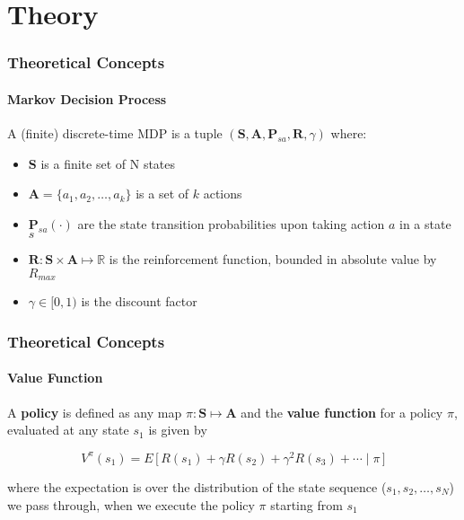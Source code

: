 \section{Theory}

\begin{frame}
	\frametitle{Theoretical Concepts}
	\framesubtitle{Markov Decision Process}
	
	\large
	
	\vspace{0.1cm}
	
	A (finite) discrete-time MDP is a tuple $ (\mathbf{S},\mathbf{A},\mathbf{P}_{sa},
	\mathbf{R},\gamma) $ where:
	\vspace{0.1cm}
	\begin{itemize}
		\item $ \mathbf{S} $ is a finite set of N states
		\vspace{0.1cm}
		\item $ \mathbf{A} = \{ a_1, a_2, \ldots, a_k \} $ is a set of $ k $ actions
		\vspace{0.1cm}
		\item $ \mathbf{P}_{sa}(\cdot) $ are the state transition probabilities upon taking
			  action $ a $ in a state $ s $
		\vspace{0.1cm}
		\item $ \mathbf{R} : \mathbf{S} \times \mathbf{A}  \mapsto \mathds{R} $ is the
			  reinforcement function, bounded in absolute value by $ R_{max} $
		\vspace{0.1cm}
		\item $ \gamma \in [0,1) $ is the discount factor
		\vspace{0.1cm}
	\end{itemize}
\end{frame}

\begin{frame}
	\frametitle{Theoretical Concepts}
	\framesubtitle{Value Function}
	
	\Large
	
	\vspace{0.2cm}
	
	A \textbf{policy} is defined as any map $ \pi : \mathbf{S} \mapsto \mathbf{A} $ and the
	\textbf{value function} for a policy $ \pi $, evaluated at any state $ s_1 $ is given by\\
	
	\vspace{-0.5cm}
	
	\begin{equation*}
		V^\pi(s_1) = E \, \Big [ \, R(s_1) + \gamma R(s_2) + \gamma^2 R(s_3) + \cdots \; | \;
		\pi \, \Big ]
	\end{equation*}
	
	where the expectation is over the distribution of the state sequence ($ s_1, s_2, \ldots,
	s_N $) we pass through, when we execute the policy $ \pi $ starting from $ s_1 $\\
\end{frame}


